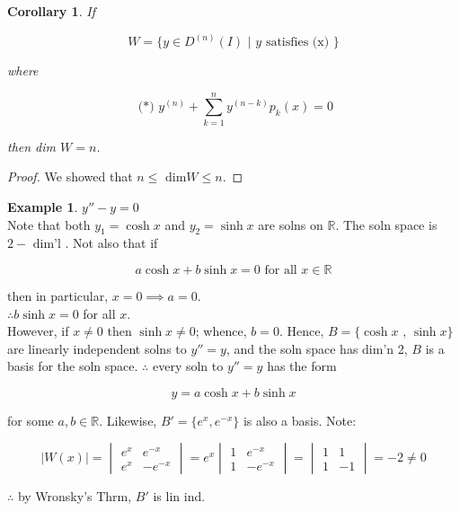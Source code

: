 \documentclass{book}
\newtheorem*{corollary}{Corollary}
\theoremstyle{definition}
\newtheorem*{example}{Example}
\begin{document}
\begin{corollary}
  If 

  \[ W = \{ y \in D^{(n)} (I) \text{ | } y \text{ satisfies (x) } \} \]

  where

  \[ \text{ (*) } y^{(n)} + \sum_{k=1}^n y^{(n-k)} p_k(x) = 0 \]

  then dim \( W = n \).
\end{corollary}

\begin{proof}
  We showed that \( n \leq \text{ dim} W \leq n \).
\end{proof}

\begin{example}
  \( y'' - y = 0 \) \\
  Note that both \( y_1 = \cosh x \) and \( y_2 = \sinh x \) are solns on
  \( \mathbb{R} \). The soln space is \( 2 - \text{ dim'l } \). Not also
  that if 

  \[ a \cosh x + b \sinh x = 0 \text{ for all } x \in \mathbb{R} \]

  then in particular, \( x = 0 \implies a = 0 \).\\
  \( \therefore b \sinh x = 0 \) for all \( x \). \\

  However, if \( x \neq 0 \) then \( \sinh x \neq 0 \); whence, \( b = 0
  \). Hence, \( B = \{ \cosh x \text{ , } \sinh x \} \) are linearly
  independent solns to \( y'' = y \), and the soln space has dim'n 2, \( B
  \) is a basis for the soln space. \( \therefore \) every soln to \( y''
  = y\) has the form 

  \[ y = a \cosh x + b \sinh x \]

  for some \( a, b \in \mathbb{R} \). Likewise, \( B' = \{ e^x, e^{-x} \}
  \) is also a basis. Note:

  \[  |W(x)| = 
  \begin{vmatrix}
    e^x & e^{-x} \\
    e^x & -e^{-x} 
  \end{vmatrix}
  = e^x
  \begin{vmatrix}
    1 & e^{-x} \\
    1 & -e^{-x} 
  \end{vmatrix}
  =
  \begin{vmatrix}
    1 & 1 \\
    1 & -1 
  \end{vmatrix}
  = -2  \neq 0
  \]

  \( \therefore \) by Wronsky's Thrm, \( B' \) is lin ind. 
\end{example}
\end{document}
